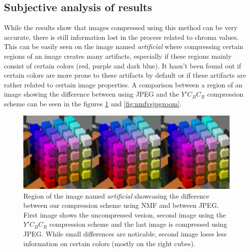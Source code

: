 \documentclass[thesis=M,english]{FITthesis}[2012/10/20]
\begin{document}
\subsection{Subjective analysis of results}
While the results show that images compressed using this method can be very
accurate, there is still information lost in the process related to chroma values.
This can be easily seen on the image named \emph{artificial} where compressing
certain regions of an image creates many artifacts, especially if these regions
mainly consist of certain colors (red, purple and dark blue). It hasn't been found out if
certain colors are more prone to these artifacts by default or if these
artifacts are rather related to certain image properties. A comparison between a region
of an image showing the difference between using JPEG and the $Y'C_BC_R$ compression
scheme can be seen in the figures \ref{fig:nmfvsjpgartifacts} and \ref{fig:nmfvsjpgzoom}.

\begin{figure}
  \centering
  \includegraphics[scale=0.33]{imgs/results/nmfvsjpgartifacts}
  \caption[Artifact comparison between JPEG and NMF $Y'C_BC_R$ compression scheme]{Region of the image named \emph{artificial} showcasing the difference
           between our compression scheme using NMF and between JPEG. First image
           shows the uncompressed vesion, second image using the $Y'C_BC_R$ compression scheme
           and the last image is compressed using JPEG. While small differences are
           noticable, second image loses less information on certain colors (mostly
           on the right cubes).}
  \label{fig:nmfvsjpgartifacts}
\end{figure}
\end{document}
